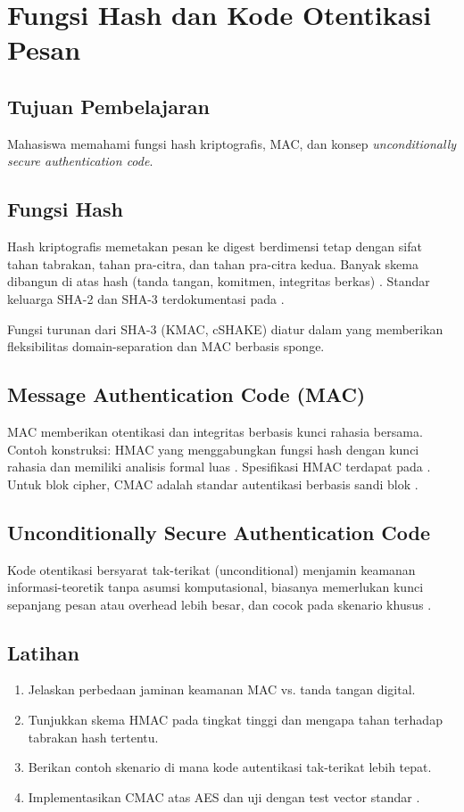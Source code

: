 \documentclass[../main.tex]{subfiles}
\begin{document}
\chapter{Fungsi Hash dan Kode Otentikasi Pesan}

\section{Tujuan Pembelajaran}
Mahasiswa memahami fungsi hash kriptografis, MAC, dan konsep \emph{unconditionally secure authentication code}.

\section{Fungsi Hash}
Hash kriptografis memetakan pesan ke digest berdimensi tetap dengan sifat tahan tabrakan, tahan pra-citra, dan tahan pra-citra kedua. Banyak skema dibangun di atas hash (tanda tangan, komitmen, integritas berkas) \citep{menezes}. Standar keluarga SHA-2 dan SHA-3 terdokumentasi pada \citep{fips180-4,fips202}.

Fungsi turunan dari SHA-3 (KMAC, cSHAKE) diatur dalam \citep{nist_sp_800_185} yang memberikan fleksibilitas domain-separation dan MAC berbasis sponge.

\section{Message Authentication Code (MAC)}
MAC memberikan otentikasi dan integritas berbasis kunci rahasia bersama. Contoh konstruksi: HMAC yang menggabungkan fungsi hash dengan kunci rahasia dan memiliki analisis formal luas \citep{katzlindell}. Spesifikasi HMAC terdapat pada \citep{rfc2104}. Untuk blok cipher, CMAC adalah standar autentikasi berbasis sandi blok \citep{nist_sp_800_38b}.

\section{Unconditionally Secure Authentication Code}
Kode otentikasi bersyarat tak-terikat (unconditional) menjamin keamanan informasi-teoretik tanpa asumsi komputasional, biasanya memerlukan kunci sepanjang pesan atau overhead lebih besar, dan cocok pada skenario khusus \citep{menezes}.

\section{Latihan}
\begin{enumerate}
  \item Jelaskan perbedaan jaminan keamanan MAC vs. tanda tangan digital.
  \item Tunjukkan skema HMAC pada tingkat tinggi dan mengapa tahan terhadap tabrakan hash tertentu.
  \item Berikan contoh skenario di mana kode autentikasi tak-terikat lebih tepat.
  \item Implementasikan CMAC atas AES dan uji dengan test vector standar \citep{nist_sp_800_38b}.
\end{enumerate}
\end{document}
